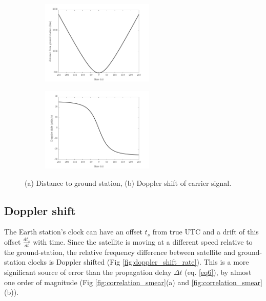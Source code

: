 \begin{figure}[ht!]
	\centering
	\begin{subfigure}[t]{0.49\linewidth}
		\centering
		\includegraphics[height=4cm]{assets/distance.png}
		\subcaption{}
	\end{subfigure}
	\begin{subfigure}[t]{0.49\textwidth}
		\centering
		\includegraphics[height=4cm]{assets/doppler_shift.png}
		\subcaption{}
	\end{subfigure}
\caption{(a) Distance to ground station, (b) Doppler shift of carrier signal.}
\label{fig:doppler_shift}
\end{figure}

\subsection{Doppler shift} 
The Earth station's clock can have an offset $t_s$ from true UTC and a drift of this offset $\frac{dt_s}{dt}$ with time. Since the satellite is moving at a different speed relative to the ground-station, the relative frequency difference between satellite and ground-station clocks is Doppler shifted (Fig \ref{fig:doppler_shift_rate}). This is a more significant source of error than the propagation delay $\Delta t$ (eq. \ref{eq6}), by almost one order of magnitude (Fig \ref{fig:correlation_smear}(a) and \ref{fig:correlation_smear}(b)). 

